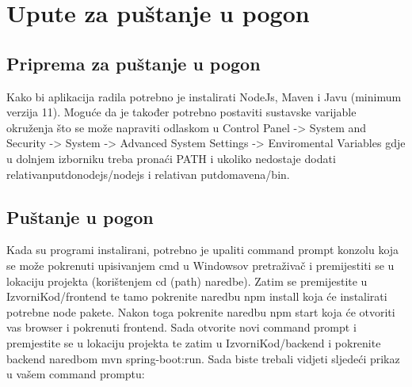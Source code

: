 			\eject 
		
		\section{Upute za puštanje u pogon}
		
			\subsection{Priprema za puštanje u pogon}
			
			Kako bi aplikacija radila potrebno je instalirati NodeJs, Maven i Javu (minimum verzija 11). Moguće da je također potrebno postaviti sustavske varijable okruženja što se može napraviti  odlaskom u Control Panel -> System and Security -> System -> Advanced System Settings -> Enviromental Variables gdje u dolnjem izborniku treba pronaći PATH i ukoliko nedostaje dodati relativanputdonodejs/nodejs i relativan putdomavena/bin.
			
			\subsection{Puštanje u pogon}
			
			Kada su programi instalirani, potrebno je upaliti command prompt konzolu koja se može pokrenuti upisivanjem cmd u Windowsov pretraživač i premijestiti se u lokaciju projekta (korištenjem cd (path) naredbe). Zatim se premijestite u IzvorniKod/frontend te tamo pokrenite naredbu npm install koja će instalirati potrebne node pakete. Nakon toga pokrenite naredbu npm start koja će otvoriti vas browser i pokrenuti frontend. Sada otvorite novi command prompt i premjestite se u lokaciju projekta te zatim u IzvorniKod/backend i pokrenite backend naredbom mvn spring-boot:run. Sada biste trebali vidjeti sljedeći prikaz u vašem command promptu:
			
			\eject 